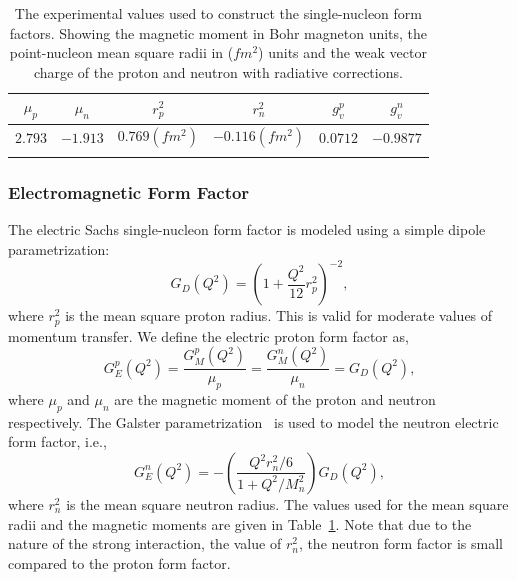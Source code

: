 \begin{table}
\caption{The experimental values used to construct the single-nucleon form factors. Showing the magnetic moment in Bohr magneton units, the point-nucleon mean square radii in ($fm^2$) units and the weak vector charge of the proton and neutron with radiative corrections.}
\label{table:ffparameters}
\begin{center}
\def\arraystretch{1.25}
\begin{tabular}{ c c | c c | c c }
\hhline{==|==|==}  
$\mu _p$ & $\mu _n$ & $r_p^2$ & $r_n^2$  & $g_v^p $ & $g_v^n $\\ 
\hline 
$2.793$ & $-1.913$ & $0.769 (fm^2)$ & $-0.116 (fm^2)$ &  $0.0712$ & $-0.9877$ \\
\hhline{==|==|==}
\end{tabular}
\end{center} 
\end{table}

\subsubsection{Electromagnetic Form Factor}
The electric Sachs single-nucleon form factor is modeled using a simple dipole parametrization:
\begin{equation}
G_D(Q^2) = \left( 1+\frac{Q^2}{12}r_p^2 \right) ^{-2},
\end{equation}
where $r_p^2$ is the mean square proton radius. This is valid for moderate values of momentum transfer. We define the electric proton form factor as,
\begin{equation}
G_E^p(Q^2) = \frac{G_M^p(Q^2)}{\mu _p} = \frac{G_M^n(Q^2)}{\mu _n}= G_D(Q^2),
\end{equation}
where $\mu _p$ and $\mu _n$ are the magnetic moment of the proton and neutron respectively. The Galster parametrization~\cite{kelly:2002:nucleon} is used to model the neutron electric form factor, i.e.,
\begin{equation}
G_E^n(Q^2)= -\left( \frac{Q^2r_n^2/6}{1+Q^2/M_n^2} \right) G_D(Q^2),
\end{equation}
where $r_n^2$ is the mean square neutron radius. The values used for the mean square radii and the magnetic moments are given in Table~\ref{table:ffparameters}. Note that due to the nature of the strong interaction, the value of $r_n^2$, the neutron form factor is small compared to the proton form factor.

